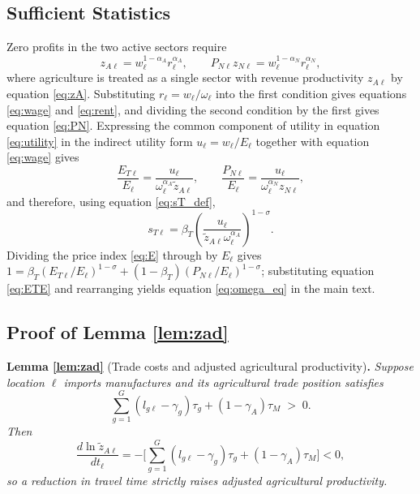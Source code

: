 \documentclass[11pt]{article}
\begin{document}
\subsection{Sufficient Statistics}
\label{app:suff}

Zero profits in the two active sectors require
\begin{equation}
    z_{A\ell}=w_\ell^{1-\alpha_A}r_\ell^{\alpha_A},\qquad P_{N\ell}z_{N\ell}=w_\ell^{1-\alpha_N}r_\ell^{\alpha_N},
    \label{eq:zeroprofit}
\end{equation}
where agriculture is treated as a single sector with revenue productivity $z_{A\ell}$ by equation \eqref{eq:zA}. Substituting $r_\ell=w_\ell/\omega_\ell$ into the first condition gives equations \eqref{eq:wage} and \eqref{eq:rent}, and dividing the second condition by the first gives equation \eqref{eq:PN}. Expressing the common component of utility in equation \eqref{eq:utility} in the indirect utility form $u_\ell=w_\ell/E_\ell$ together with equation \eqref{eq:wage} gives
\begin{equation}
\frac{E_{T\ell}}{E_\ell}
=
\frac{u_\ell}{\omega_\ell^{\alpha_A}\tilde z_{A\ell}},
\qquad
\frac{P_{N\ell}}{E_\ell}
=
\frac{u_\ell}{\omega_\ell^{\alpha_N}z_{N\ell}},
\label{eq:ETE}
\end{equation}
and therefore, using equation \eqref{eq:sT_def},
\begin{equation}
s_{T\ell}
=
\beta_T
\left(
\frac{u_\ell}{\tilde z_{A\ell} \omega_\ell^{\alpha_A}}
\right)^{1-\sigma}.
\label{eq:sT}
\end{equation}
Dividing the price index \eqref{eq:E} through by $E_\ell$ gives $1=\beta_T\left(E_{T\ell}/E_\ell\right)^{1-\sigma}+(1-\beta_T)\left(P_{N\ell}/E_\ell\right)^{1-\sigma}$; substituting equation \eqref{eq:ETE} and rearranging yields equation \eqref{eq:omega_eq} in the main text.

\subsection{Proof of Lemma \texorpdfstring{\ref{lem:zad}}{1}}
\label{app:proof_zad}

\noindent\textbf{Lemma \ref{lem:zad}} (Trade costs and adjusted agricultural
productivity)\textbf{.} \emph{Suppose location $\ell$ imports manufactures and its agricultural
trade position satisfies}
\[
\sum_{g=1}^G \left(l_{g\ell}-\gamma_g\right)\tau_g + (1-\gamma_A)\tau_M \;>\; 0.
\]
\emph{Then}
\[
\frac{d \ln \tilde z_{A\ell}}{d t_\ell}
= -\Big[\sum_{g=1}^G \left(l_{g\ell}-\gamma_g\right)\tau_g + (1-\gamma_A)\tau_M\Big] < 0,
\]
\emph{so a reduction in travel time strictly raises adjusted agricultural
productivity.}\medskip
\end{document}
